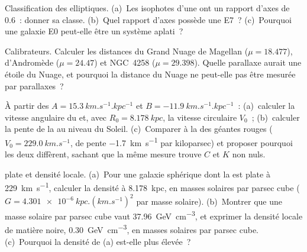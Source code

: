 \begin{exercise}[$\star$]\label{exo:b3:milky-way-galaxies:3}
Classification des elliptiques. (a)~Les isophotes d'une  ont un
rapport d'axes de 0.6~: donner sa classe. (b)~Quel rapport d'axes possède une E7~?
(c)~Pourquoi une galaxie E0 peut-elle être un système aplati~?
\end{exercise}

\begin{exercise}[$\star$]\label{exo:b3:milky-way-galaxies:4}
Calibrateurs. Calculer les distances du Grand Nuage de Magellan
($\mu = 18.477$), d'Andromède ($\mu = 24.47$) et NGC~4258
($\mu = 29.398$). Quelle parallaxe aurait une étoile du Nuage, et pourquoi
la distance du Nuage ne peut-elle pas être mesurée par parallaxes~?
\end{exercise}

\begin{exercise}[$\star\star$]\label{exo:b3:milky-way-galaxies:5}
À partir des  $A = \qty{15.3}{km.s^{-1}.kpc^{-1}}$ et
$B = \qty{-11.9}{km.s^{-1}.kpc^{-1}}$~: (a)~calculer la vitesse angulaire du
 et, avec $R_0 = \qty{8.178}{kpc}$, la vitesse circulaire $V_0$~;
(b)~calculer la pente de la  au niveau du Soleil. (c)~Comparer
à la  des géantes rouges ($V_0 = \qty{229.0}{km.s^{-1}}$,
de pente \qty{-1.7}{km.s^{-1}} par kiloparsec) et proposer pourquoi les deux
diffèrent, sachant que la même mesure trouve $C$ et $K$ non nuls.
\end{exercise}

\begin{exercise}[$\star\star$]\label{exo:b3:milky-way-galaxies:6}
 plate et densité locale. (a)~Pour une galaxie sphérique
dont la  est plate à \qty{229}{km.s^{-1}}, calculer la densité à
\qty{8.178}{kpc}, en masses solaires par parsec cube
($G = \qty{4.301e-6}{kpc.(km.s^{-1})^2}$ par masse solaire). (b)~Montrer que
une masse solaire par parsec cube vaut \qty{37.96}{GeV.cm^{-3}}, et exprimer
la densité locale de matière noire, \qty{0.30}{GeV.cm^{-3}}, en masses solaires
par parsec cube. (c)~Pourquoi la densité de (a) est-elle plus élevée~?
\end{exercise}

